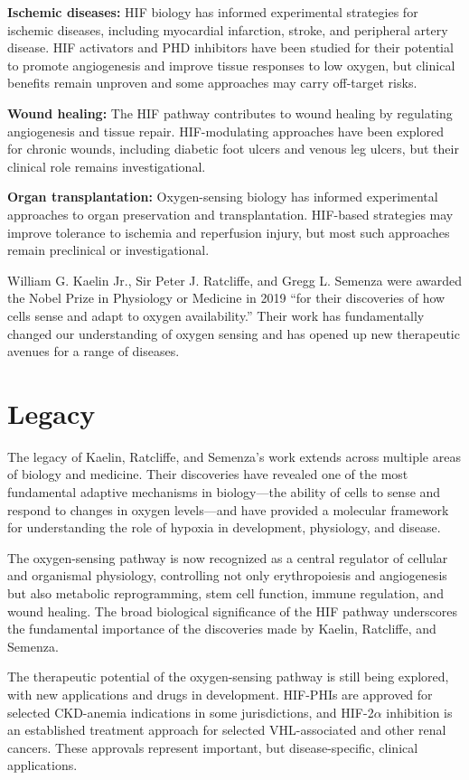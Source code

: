 \textbf{Ischemic diseases:} HIF biology has informed experimental strategies for ischemic diseases, including myocardial infarction, stroke, and peripheral artery disease. HIF activators and PHD inhibitors have been studied for their potential to promote angiogenesis and improve tissue responses to low oxygen, but clinical benefits remain unproven and some approaches may carry off-target risks.

\textbf{Wound healing:} The HIF pathway contributes to wound healing by regulating angiogenesis and tissue repair. HIF-modulating approaches have been explored for chronic wounds, including diabetic foot ulcers and venous leg ulcers, but their clinical role remains investigational.

\textbf{Organ transplantation:} Oxygen-sensing biology has informed experimental approaches to organ preservation and transplantation. HIF-based strategies may improve tolerance to ischemia and reperfusion injury, but most such approaches remain preclinical or investigational.

William G. Kaelin Jr., Sir Peter J. Ratcliffe, and Gregg L. Semenza were awarded the Nobel Prize in Physiology or Medicine in 2019 ``for their discoveries of how cells sense and adapt to oxygen availability.'' Their work has fundamentally changed our understanding of oxygen sensing and has opened up new therapeutic avenues for a range of diseases.

\section{Legacy}

The legacy of Kaelin, Ratcliffe, and Semenza's work extends across multiple areas of biology and medicine. Their discoveries have revealed one of the most fundamental adaptive mechanisms in biology---the ability of cells to sense and respond to changes in oxygen levels---and have provided a molecular framework for understanding the role of hypoxia in development, physiology, and disease.

The oxygen-sensing pathway is now recognized as a central regulator of cellular and organismal physiology, controlling not only erythropoiesis and angiogenesis but also metabolic reprogramming, stem cell function, immune regulation, and wound healing. The broad biological significance of the HIF pathway underscores the fundamental importance of the discoveries made by Kaelin, Ratcliffe, and Semenza.

The therapeutic potential of the oxygen-sensing pathway is still being explored, with new applications and drugs in development. HIF-PHIs are approved for selected CKD-anemia indications in some jurisdictions, and HIF-2$\alpha$ inhibition is an established treatment approach for selected VHL-associated and other renal cancers. These approvals represent important, but disease-specific, clinical applications.

